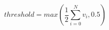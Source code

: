 


\begin{equation}
  \label{threshold_eq}
  threshold = max(\frac{1}{2} \sum_{i=0}^{N} v_i, 0.5)
\end{equation}


